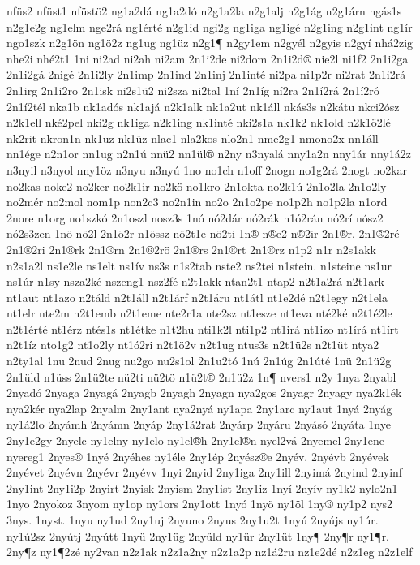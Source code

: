 {nfüs2
nfüst1
nfüstö2
ng1a2dá
ng1a2dó
n2g1a2la
n2g1alj
n2g1ág
n2g1árn
ngás1s
n2g1e2g
ng1elm
nge2rá
ng1érté
n2g1id
ngi2g
ng1iga
ng1igé
n2g1ing
n2g1int
ng1ír
ngo1szk
n2g1ön
ng1ö2z
ng1ug
ng1üz
n2g1¶
n2gy1em
n2gyél
n2gyis
n2gyí
nhá2zig
nhe2i
nhé2t1
1ni
ni2ad
ni2ah
ni2am
2n1i2de
ni2dom
2n1i2d®
nie2l
ni1f2
2n1i2ga
2n1i2gá
2nigé
2n1i2ly
2n1imp
2n1ind
2n1inj
2n1inté
ni2pa
ni1p2r
ni2rat
2n1i2rá
2n1irg
2n1i2ro
2n1isk
ni2s1ü2
ni2sza
ni2tal
1ní
2n1íg
ní2ra
2n1í2rá
2n1í2ró
2n1í2tél
nka1b
nk1adós
nk1ajá
n2k1alk
nk1a2ut
nk1áll
nkás3s
n2kátu
nkci2ósz
n2k1ell
nké2pel
nki2g
nk1iga
n2k1ing
nk1inté
nki2s1a
nk1k2
nk1old
n2k1ö2lé
nk2rit
nkron1n
nk1uz
nk1üz
nlac1
nla2kos
nlo2n1
nme2g1
nmono2x
nn1áll
nn1ége
n2n1or
nn1ug
n2n1ú
nnü2
nn1ül®
n2ny
n3nyalá
nny1a2n
nny1ár
nny1á2z
n3nyil
n3nyol
nny1öz
n3nyu
n3nyú
1no
no1ch
n1off
2nogn
no1g2rá
2nogt
no2kar
no2kas
noke2
no2ker
no2k1ir
no2kö
no1kro
2n1okta
no2k1ú
2n1o2la
2n1o2ly
no2mér
no2mol
nom1p
non2c3
no2n1in
no2o
2n1o2pe
no1p2h
no1p2la
n1ord
2nore
n1org
no1szkó
2n1oszl
nosz3s
1nó
nó2dár
nó2rák
n1ó2rán
nó2rí
nósz2
nó2s3zen
1nö
nö2l
2n1ö2r
n1össz
nö2t1e
nö2ti
1n®
n®e2
n®2ir
2n1®r.
2n1®2ré
2n1®2ri
2n1®rk
2n1®rn
2n1®2rö
2n1®rs
2n1®rt
2n1®rz
n1p2
n1r
n2s1akk
n2s1a2l
ns1e2le
ns1elt
ns1ív
ns3s
n1s2tab
nste2
ns2tei
n1stein.
n1steine
ns1ur
ns1úr
n1sy
nsza2ké
nszeng1
nsz2fé
n2t1akk
ntan2t1
ntap2
n2t1a2rá
n2t1ark
nt1aut
nt1azo
n2táld
n2t1áll
n2t1árf
n2t1áru
nt1átl
nt1e2dé
n2t1egy
n2t1ela
nt1elr
nte2m
n2t1emb
n2t1eme
nte2r1a
nte2sz
nt1esze
nt1eva
nté2ké
n2t1é2le
n2t1érté
nt1érz
ntés1s
nt1étke
n1t2hu
nti1k2l
nti1p2
nt1irá
nt1izo
nt1írá
nt1írt
n2t1íz
nto1g2
nt1o2ly
nt1ó2ri
n2t1ö2v
n2t1ug
ntus3s
n2t1ü2s
n2t1üt
ntya2
n2ty1al
1nu
2nud
2nug
nu2go
nu2s1ol
2n1u2tó
1nú
2n1úg
2n1úté
1nü
2n1ü2g
2n1üld
n1üss
2n1ü2te
nü2ti
nü2tö
n1ü2t®
2n1ü2z
1n¶
nvers1
n2y
1nya
2nyabl
2nyadó
2nyaga
2nyagá
2nyagb
2nyagh
2nyagn
nya2gos
2nyagr
2nyagy
nya2k1ék
nya2kér
nya2lap
2nyalm
2ny1ant
nya2nyá
ny1apa
2ny1arc
ny1aut
1nyá
2nyág
ny1á2lo
2nyámh
2nyámn
2nyáp
2ny1á2rat
2nyárp
2nyáru
2nyásó
2nyáta
1nye
2ny1e2gy
2nyelc
ny1elny
ny1elo
ny1el®h
2ny1el®n
nyel2vá
2nyemel
2ny1ene
nyereg1
2nyes®
1nyé
2nyéhes
ny1éle
2ny1ép
2nyész®e
2nyév.
2nyévb
2nyévek
2nyévet
2nyévn
2nyévr
2nyévv
1nyi
2nyid
2ny1iga
2ny1ill
2nyimá
2nyind
2nyinf
2ny1int
2ny1i2p
2nyirt
2nyisk
2nyism
2ny1ist
2ny1iz
1nyí
2nyív
ny1k2
nylo2n1
1nyo
2nyokoz
3nyom
ny1op
ny1ors
2ny1ott
1nyó
1nyö
ny1öl
1ny®
ny1p2
nys2
3nys.
1nyst.
1nyu
ny1ud
2ny1uj
2nyuno
2nyus
2ny1u2t
1nyú
2nyújs
ny1úr.
ny1ú2sz
2nyútj
2nyútt
1nyü
2ny1üg
2nyüld
ny1ür
2ny1üt
1ny¶
2ny¶r
ny1¶r.
2ny¶z
ny1¶2zé
ny2van
n2z1ak
n2z1a2ny
n2z1a2p
nz1á2ru
nz1e2dé
n2z1eg
n2z1elf
}
